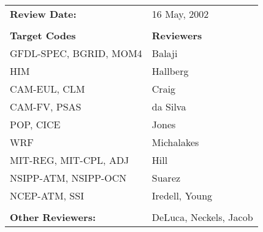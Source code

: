 \begin{tabular}{l l}

{\bf Review Date:}            & 16 May, 2002 \\ \\

{\bf Target Codes}            & {\bf Reviewers} \\
GFDL-SPEC, BGRID, MOM4        & Balaji \\ 
HIM                           & Hallberg \\
CAM-EUL, CLM                  & Craig \\
CAM-FV, PSAS                  & da Silva \\
POP, CICE                     & Jones \\
WRF                           & Michalakes \\
MIT-REG, MIT-CPL, ADJ         & Hill \\
NSIPP-ATM, NSIPP-OCN          & Suarez \\
NCEP-ATM, SSI                 & Iredell, Young \\ \\

{\bf Other Reviewers:}        & DeLuca, Neckels, Jacob

\end{tabular}


%



%

%

